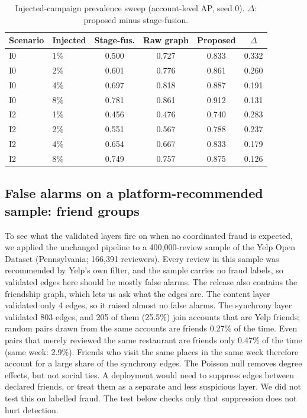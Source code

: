 \documentclass[pdflatex,sn-basic]{sn-jnl}
\theoremstyle{thmstyleone}
\theoremstyle{thmstylethree}
\begin{document}
\begin{table}[t]
\caption{Injected-campaign prevalence sweep (account-level AP, seed 0). $\Delta$: proposed minus stage-fusion.}\label{tab:injfrac}
\small\setlength{\tabcolsep}{3pt}
\begin{tabular}{@{}llcccc@{}}
\toprule
Scenario & Injected & Stage-fus. & Raw graph & Proposed & $\Delta$ \\
\midrule
I0 & 1\% & 0.500 & 0.727 & 0.833 & 0.332 \\
I0 & 2\% & 0.601 & 0.776 & 0.861 & 0.260 \\
I0 & 4\% & 0.697 & 0.818 & 0.887 & 0.191 \\
I0 & 8\% & 0.781 & 0.861 & 0.912 & 0.131 \\
I2 & 1\% & 0.456 & 0.476 & 0.740 & 0.283 \\
I2 & 2\% & 0.551 & 0.567 & 0.788 & 0.237 \\
I2 & 4\% & 0.654 & 0.667 & 0.833 & 0.179 \\
I2 & 8\% & 0.749 & 0.757 & 0.875 & 0.126 \\
\bottomrule
\end{tabular}
\end{table}

\subsection{False alarms on a platform-recommended sample: friend groups}\label{sec:res_open}
To see what the validated layers fire on when no coordinated fraud is expected, we applied the unchanged pipeline to a 400{,}000-review sample of the Yelp Open Dataset (Pennsylvania; 166{,}391 reviewers). Every review in this sample was recommended by Yelp's own filter, and the sample carries no fraud labels, so validated edges here should be mostly false alarms. The release also contains the friendship graph, which lets us ask what the edges are.
The content layer validated only 4 edges, so it raised almost no false alarms. The synchrony layer validated 803 edges, and 205 of them (25.5\%) join accounts that are Yelp friends; random pairs drawn from the same accounts are friends 0.27\% of the time. Even pairs that merely reviewed the same restaurant are friends only 0.47\% of the time (same week: 2.9\%). Friends who visit the same places in the same week therefore account for a large share of the synchrony edges. The Poisson null removes degree effects, but not social ties. A deployment would need to suppress edges between declared friends, or treat them as a separate and less suspicious layer. We did not test this on labelled fraud. The test below checks only that suppression does not hurt detection.
\end{document}
